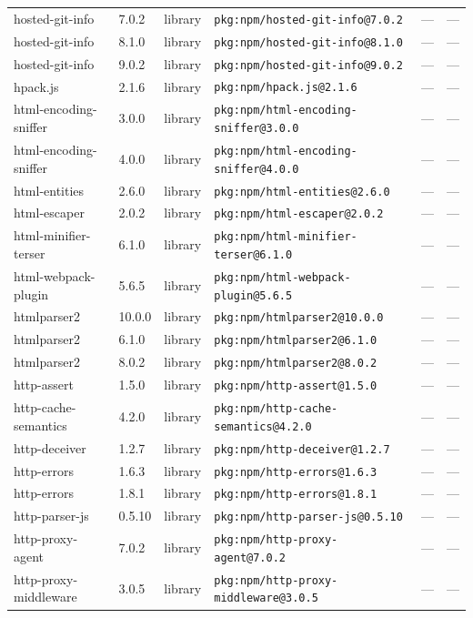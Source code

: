 \documentclass[11pt]{article}
\begin{document}
\begin{longtable}{|l|l|l|p{2.2cm}|l|p{4cm}|}
hosted-git-info & 7.0.2 & library & \texttt{pkg:npm/hosted-git-info@7.0.2} & — & — \\
hosted-git-info & 8.1.0 & library & \texttt{pkg:npm/hosted-git-info@8.1.0} & — & — \\
hosted-git-info & 9.0.2 & library & \texttt{pkg:npm/hosted-git-info@9.0.2} & — & — \\
hpack.js & 2.1.6 & library & \texttt{pkg:npm/hpack.js@2.1.6} & — & — \\
html-encoding-sniffer & 3.0.0 & library & \texttt{pkg:npm/html-encoding-sniffer@3.0.0} & — & — \\
html-encoding-sniffer & 4.0.0 & library & \texttt{pkg:npm/html-encoding-sniffer@4.0.0} & — & — \\
html-entities & 2.6.0 & library & \texttt{pkg:npm/html-entities@2.6.0} & — & — \\
html-escaper & 2.0.2 & library & \texttt{pkg:npm/html-escaper@2.0.2} & — & — \\
html-minifier-terser & 6.1.0 & library & \texttt{pkg:npm/html-minifier-terser@6.1.0} & — & — \\
html-webpack-plugin & 5.6.5 & library & \texttt{pkg:npm/html-webpack-plugin@5.6.5} & — & — \\
htmlparser2 & 10.0.0 & library & \texttt{pkg:npm/htmlparser2@10.0.0} & — & — \\
htmlparser2 & 6.1.0 & library & \texttt{pkg:npm/htmlparser2@6.1.0} & — & — \\
htmlparser2 & 8.0.2 & library & \texttt{pkg:npm/htmlparser2@8.0.2} & — & — \\
http-assert & 1.5.0 & library & \texttt{pkg:npm/http-assert@1.5.0} & — & — \\
http-cache-semantics & 4.2.0 & library & \texttt{pkg:npm/http-cache-semantics@4.2.0} & — & — \\
http-deceiver & 1.2.7 & library & \texttt{pkg:npm/http-deceiver@1.2.7} & — & — \\
http-errors & 1.6.3 & library & \texttt{pkg:npm/http-errors@1.6.3} & — & — \\
http-errors & 1.8.1 & library & \texttt{pkg:npm/http-errors@1.8.1} & — & — \\
http-parser-js & 0.5.10 & library & \texttt{pkg:npm/http-parser-js@0.5.10} & — & — \\
http-proxy-agent & 7.0.2 & library & \texttt{pkg:npm/http-proxy-agent@7.0.2} & — & — \\
http-proxy-middleware & 3.0.5 & library & \texttt{pkg:npm/http-proxy-middleware@3.0.5} & — & — \\

\end{longtable}
\end{document}
